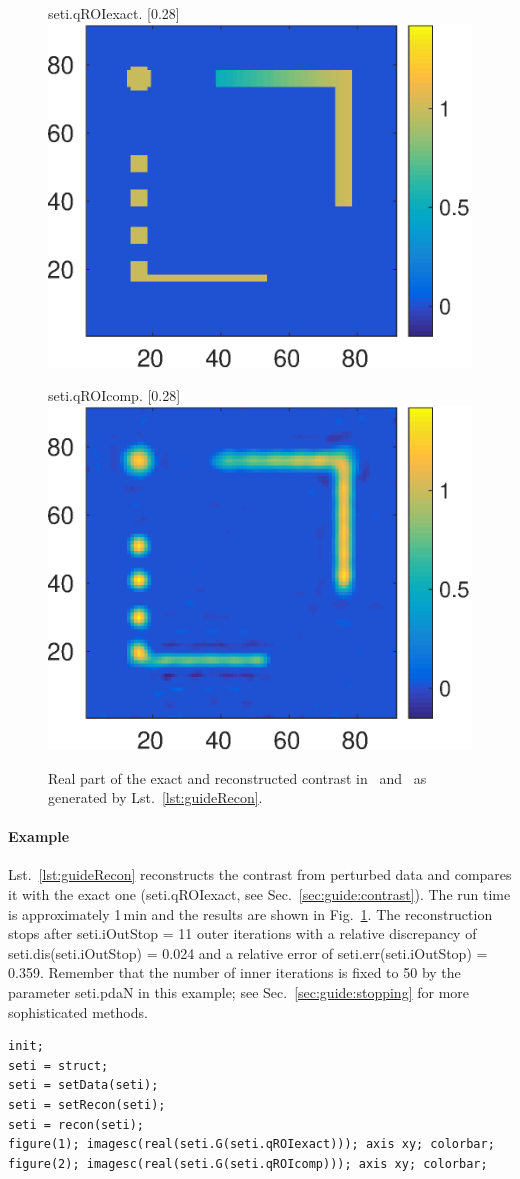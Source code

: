 \documentclass[a4paper]{article}
\begin{document}
\begin{figure}
\centering
\begin{subcaptionbox}{\textsf{seti.qROIexact}.
   \label{fig:guide:recon1}}[0.28\textwidth]{
   \includegraphics[height=0.22\textwidth]{figs/fig_guideRecon1}
  }
\end{subcaptionbox}
\begin{subcaptionbox}{\textsf{seti.qROIcomp}.
   \label{fig:guide:recon2}}[0.28\textwidth]{
   \includegraphics[height=0.22\textwidth]{figs/fig_guideRecon2}
  }
\end{subcaptionbox}
\caption{Real part of the exact and reconstructed contrast in~ and~ as generated by Lst.~\ref{lst:guideRecon}.}
\label{fig:guide:recon}
\end{figure}

\paragraph{Example} Lst.~\ref{lst:guideRecon} reconstructs the contrast from perturbed data and compares it with the exact one (\textsf{seti.qROIexact}, see Sec.~\ref{sec:guide:contrast}). The run time is approximately 1\,min and the results are shown in Fig.~\ref{fig:guide:recon}. The reconstruction stops after \textsf{seti.iOutStop} = 11 outer iterations with a relative discrepancy of \textsf{seti.dis(seti.iOutStop)} = 0.024 and a relative error of \textsf{seti.err(seti.iOutStop)} = 0.359. Remember that the number of inner iterations is fixed to 50 by the parameter \textsf{seti.pdaN} in this example; see Sec.~\ref{sec:guide:stopping} for more sophisticated methods.

\begin{lstlisting}[caption={Variational reconstruction (\emph{source code}: \textsf{guides/guideRecon.m}).},label=lst:guideRecon]
init;
seti = struct;
seti = setData(seti);
seti = setRecon(seti);
seti = recon(seti);
figure(1); imagesc(real(seti.G(seti.qROIexact))); axis xy; colorbar;
figure(2); imagesc(real(seti.G(seti.qROIcomp))); axis xy; colorbar;
\end{lstlisting}
\end{document}
